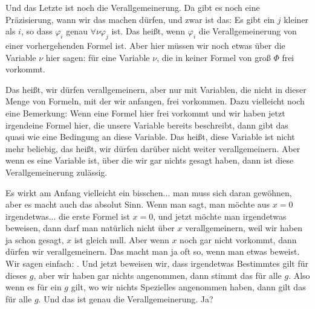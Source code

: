 \begin{spoken-clean}[00:22:30 - 00:24:45]
Und das Letzte ist noch die Verallgemeinerung. Da gibt es noch eine Präzisierung, wann wir das machen dürfen, und zwar ist das: Es gibt ein $j$ kleiner als $i$, so dass $\varphi_i$ genau $\forall \nu \varphi_j$ ist. Das heißt, wenn $\varphi_i$ die Verallgemeinerung von einer vorhergehenden Formel ist. Aber hier müssen wir noch etwas über die Variable $\nu$ hier sagen: für eine Variable $\nu$, die in keiner Formel von groß $\Phi$ frei vorkommt.

Das heißt, wir dürfen verallgemeinern, aber nur mit Variablen, die nicht in dieser Menge von Formeln, mit der wir anfangen, frei vorkommen. Dazu vielleicht noch eine Bemerkung: Wenn eine Formel hier frei vorkommt und wir haben jetzt irgendeine Formel hier, die unsere Variable bereits beschreibt, dann gibt das quasi wie eine Bedingung an diese Variable. Das heißt, diese Variable ist nicht mehr beliebig, das heißt, wir dürfen darüber nicht weiter verallgemeinern. Aber wenn es eine Variable ist, über die wir gar nichts gesagt haben, dann ist diese Verallgemeinerung zulässig.

Es wirkt am Anfang vielleicht ein bisschen... man muss sich daran gewöhnen, aber es macht auch das absolut Sinn. Wenn man sagt, man möchte aus $x=0$ irgendetwas... die erste Formel ist $x=0$, und jetzt möchte man irgendetwas beweisen, dann darf man natürlich nicht über $x$ verallgemeinern, weil wir haben ja schon gesagt, $x$ ist gleich null. Aber wenn $x$ noch gar nicht vorkommt, dann dürfen wir verallgemeinern. Das macht man ja oft so, wenn man etwas beweist. Wir sagen einfach: . Und jetzt beweisen wir, dass irgendetwas Bestimmtes gilt für dieses $g$, aber wir haben gar nichts angenommen, dann stimmt das für alle $g$. Also wenn es für ein $g$ gilt, wo wir nichts Spezielles angenommen haben, dann gilt das für alle $g$. Und das ist genau die Verallgemeinerung. Ja?



\end{spoken-clean}
